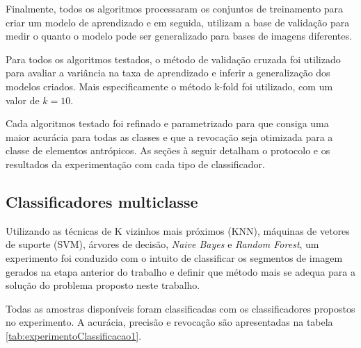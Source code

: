 Finalmente, todos os algoritmos processaram os conjuntos de treinamento para criar um modelo de aprendizado e em seguida, utilizam a base de validação para medir o quanto o modelo pode ser generalizado para bases de imagens diferentes.

Para todos os algoritmos testados, o método de validação cruzada foi utilizado para avaliar a variância na taxa de aprendizado e inferir a generalização dos modelos criados. Mais especificamente o método k-fold foi utilizado, com um valor de $k=10$.

Cada algoritmos testado foi refinado e parametrizado para que consiga uma maior acurácia para todas as classes e que a revocação seja otimizada para a classe de elementos antrópicos. As seções à seguir detalham o protocolo e os resultados da experimentação com cada tipo de classificador.

\subsection{Classificadores multiclasse}

Utilizando as técnicas de K vizinhos mais próximos (KNN), máquinas de vetores de suporte (SVM), árvores de decisão, \textit{Naive Bayes} e \textit{Random Forest}, um experimento foi conduzido com o intuito de classificar os segmentos de imagem gerados na etapa anterior do trabalho e definir que método mais se adequa para a solução do problema proposto neste trabalho.

Todas as amostras disponíveis foram classificadas com os classificadores propostos no experimento. A acurácia, precisão e revocação são apresentadas na tabela \ref{tab:experimentoClassificacao1}.

